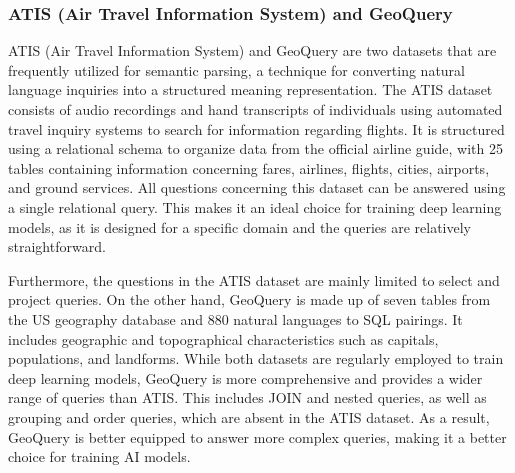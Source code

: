 \subsubsection{ATIS (Air Travel Information System) and GeoQuery}
\label{sec:atis}

ATIS (Air Travel Information System)\cite{dahl-etal-1994-expanding} and GeoQuery \cite{10.1007/3-540-44795-4_40} are two datasets that are frequently utilized for semantic parsing, a technique for converting natural language inquiries into a structured meaning representation. The ATIS dataset consists of audio recordings and hand transcripts of individuals using automated travel inquiry systems to search for information regarding flights. It is structured using a relational schema to organize data from the official airline guide, with 25 tables containing information concerning fares, airlines, flights, cities, airports, and ground services.
All questions concerning this dataset can be answered using a single relational query. This makes it an ideal choice for training deep learning models, as it is designed for a specific domain and the queries are relatively straightforward.

Furthermore, the questions in the ATIS dataset \cite{dahl-etal-1994-expanding} are mainly limited to select and project queries. On the other hand, GeoQuery \cite{10.1007/3-540-44795-4_40} is made up of seven tables from the US geography database and 880 natural languages to SQL pairings. It includes geographic and topographical characteristics such as capitals, populations, and landforms. While both datasets are regularly employed to train deep learning models, GeoQuery \cite{10.1007/3-540-44795-4_40} is more comprehensive and provides a wider range of queries than ATIS. This includes JOIN and nested queries, as well as grouping and order queries, which are absent in the ATIS dataset\cite{dahl-etal-1994-expanding}. As a result, GeoQuery is better equipped to answer more complex queries, making it a better choice for training AI models.



